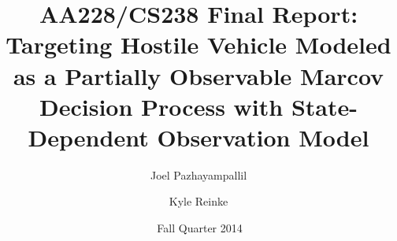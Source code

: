 \documentclass[]{article}
\title{AA228/CS238 Final Report: Targeting Hostile Vehicle Modeled as a Partially Observable Marcov Decision Process with State-Dependent Observation Model}
\author{ Joel Pazhayampallil \and Kyle Reinke}
\date{$\:$Fall Quarter 2014}
\begin{document}
\maketitle








\break

\break






\end{document}
